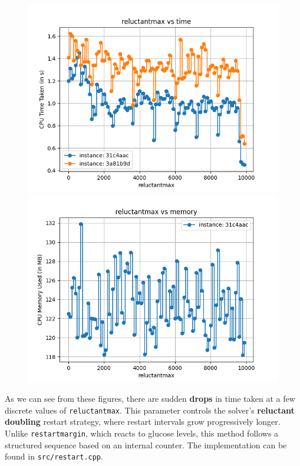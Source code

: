 \documentclass{article}
\begin{document}
    \begin{figure}[H]
        \centering
        \begin{minipage}{0.45\textwidth}
            \centering
            \includegraphics[width = \linewidth]{reluctantmax-0.png}
        \end{minipage}
        \hfill
        \begin{minipage}{0.45\textwidth}
            \centering
            \includegraphics[width = \linewidth]{reluctantmax-1.png}
        \end{minipage}
    \end{figure}
    As we can see from these figures, there are sudden \textbf{drops} in time
    taken at a few discrete values of \texttt{reluctantmax}. This parameter
    controls the solver’s \textbf{reluctant doubling} restart strategy, where
    restart intervals grow progressively longer. Unlike \texttt{restartmargin},
    which reacts to glucose levels, this method follows a structured sequence
    based on an internal counter. The implementation can be found in
    \texttt{src/restart.cpp}.
\end{document}
